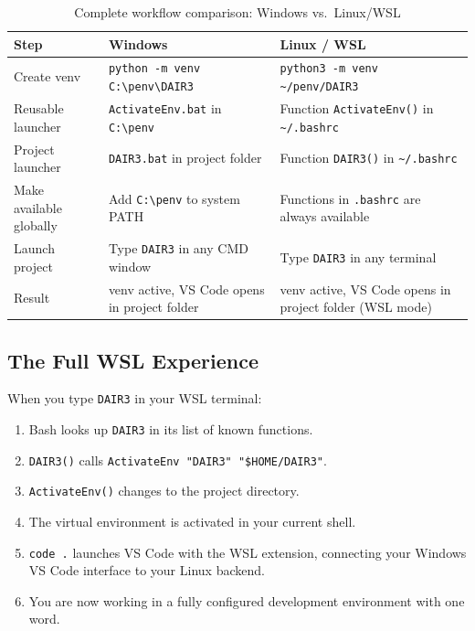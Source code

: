 \begin{table}[h]
\centering
\caption{Complete workflow comparison: Windows vs.\ Linux/WSL}
\label{fig:workflow}
\begin{tabular}{@{}p{}p{}p{}@{}}
\toprule
\textbf{Step} & \textbf{Windows} & \textbf{Linux / WSL} \\
\midrule
Create venv
  & \texttt{python -m venv C:\textbackslash penv\textbackslash DAIR3}
  & \texttt{python3 -m venv \textasciitilde/penv/DAIR3} \\[4pt]
Reusable launcher
  & \texttt{ActivateEnv.bat} in \texttt{C:\textbackslash penv}
  & Function \texttt{ActivateEnv()} in \texttt{\textasciitilde/.bashrc} \\[4pt]
Project launcher
  & \texttt{DAIR3.bat} in project folder
  & Function \texttt{DAIR3()} in \texttt{\textasciitilde/.bashrc} \\[4pt]
Make available globally
  & Add \texttt{C:\textbackslash penv} to system PATH
  & Functions in \texttt{.bashrc} are always available \\[4pt]
Launch project
  & Type \texttt{DAIR3} in any CMD window
  & Type \texttt{DAIR3} in any terminal \\[4pt]
Result
  & venv active, VS Code opens in project folder
  & venv active, VS Code opens in project folder (WSL mode) \\
\bottomrule
\end{tabular}
\end{table}

\subsection{The Full WSL Experience}

When you type \texttt{DAIR3} in your WSL terminal:

\begin{enumerate}
  \item Bash looks up \texttt{DAIR3} in its list of known functions.
  \item \texttt{DAIR3()} calls \texttt{ActivateEnv "DAIR3" "\$HOME/DAIR3"}.
  \item \texttt{ActivateEnv()} changes to the project directory.
  \item The virtual environment is activated in your current shell.
  \item \texttt{code .} launches VS Code with the WSL extension,
        connecting your Windows VS Code interface to your Linux backend.
  \item You are now working in a fully configured development environment
        with one word.
\end{enumerate}

